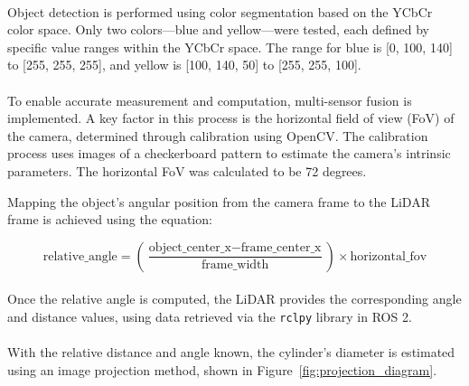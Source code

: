 \paragraph*{}
Object detection is performed using color segmentation based on the YCbCr color space. Only two colors—blue and yellow—were tested, each defined by specific value ranges within the YCbCr space. The range for blue is [0, 100, 140] to [255, 255, 255], and yellow is [100, 140, 50] to [255, 255, 100].

\paragraph*{}
To enable accurate measurement and computation, multi-sensor fusion is implemented. A key factor in this process is the horizontal field of view (FoV) of the camera, determined through calibration using OpenCV. The calibration process uses images of a checkerboard pattern to estimate the camera’s intrinsic parameters. The horizontal FoV was calculated to be 72 degrees.

Mapping the object’s angular position from the camera frame to the LiDAR frame is achieved using the equation:

\begin{equation}
\text{relative\_angle} = \left( \frac{\text{object\_center\_x} - \text{frame\_center\_x}}{\text{frame\_width}} \right) \times \text{horizontal\_fov}
\label{eq:relative_angle}
\end{equation}

\paragraph*{}
Once the relative angle is computed, the LiDAR provides the corresponding angle and distance values, using data retrieved via the \texttt{rclpy} library in ROS 2.

\paragraph*{}
With the relative distance and angle known, the cylinder’s diameter is estimated using an image projection method, shown in Figure~\ref{fig:projection_diagram}.

